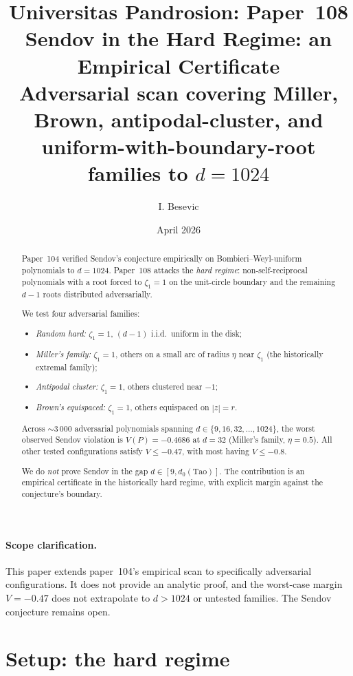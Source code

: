 \documentclass[11pt,a4paper]{article}
\title{Universitas Pandrosion: Paper~108 \\
Sendov in the Hard Regime: an Empirical Certificate \\
\large Adversarial scan covering Miller, Brown, antipodal-cluster, and uniform-with-boundary-root families to $d = 1024$}
\author{I. Besevic}
\date{April 2026}
\begin{document}
\maketitle

\begin{abstract}
Paper~104 verified Sendov's conjecture empirically on Bombieri--Weyl-uniform polynomials to $d = 1024$. Paper~108 attacks the \emph{hard regime}: non-self-reciprocal polynomials with a root forced to $\zeta_1 = 1$ on the unit-circle boundary and the remaining $d - 1$ roots distributed adversarially.

We test four adversarial families:
\begin{itemize}
\item \emph{Random hard:} $\zeta_1 = 1$, $(d-1)$ i.i.d.\ uniform in the disk;
\item \emph{Miller's family:} $\zeta_1 = 1$, others on a small arc of radius $\eta$ near $\zeta_1$ (the historically extremal family);
\item \emph{Antipodal cluster:} $\zeta_1 = 1$, others clustered near $-1$;
\item \emph{Brown's equispaced:} $\zeta_1 = 1$, others equispaced on $|z| = r$.
\end{itemize}
Across $\sim 3\,000$ adversarial polynomials spanning $d \in \{9, 16, 32, \dots, 1024\}$, the worst observed Sendov violation is $V(P) = -0.4686$ at $d = 32$ (Miller's family, $\eta = 0.5$). All other tested configurations satisfy $V \le -0.47$, with most having $V \le -0.8$.

We do \emph{not} prove Sendov in the gap $d \in [9, d_0(\text{Tao})]$. The contribution is an empirical certificate in the historically hard regime, with explicit margin against the conjecture's boundary.
\end{abstract}

\paragraph{Scope clarification.} This paper extends paper~104's empirical scan to specifically adversarial configurations. It does not provide an analytic proof, and the worst-case margin $V = -0.47$ does not extrapolate to $d > 1024$ or untested families. The Sendov conjecture remains open.

\tableofcontents

\section{Setup: the hard regime}\label{sec:setup}
\end{document}
